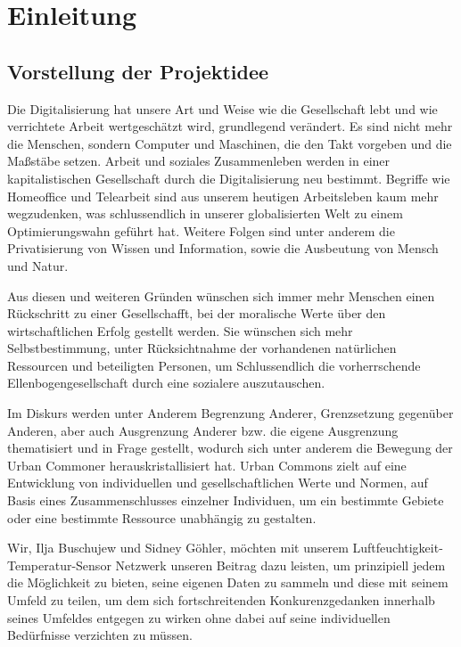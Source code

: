 
\chapter{Einleitung} \label{Einleitung}

\section{Vorstellung der Projektidee} \label{Vorstellung der Projektidee}

Die Digitalisierung hat unsere Art und Weise wie die Gesellschaft lebt und wie verrichtete Arbeit wertgeschätzt wird, grundlegend verändert. Es sind nicht mehr die Menschen, sondern Computer und Maschinen, die den Takt vorgeben und die Maßstäbe setzen. Arbeit und soziales Zusammenleben werden in einer kapitalistischen Gesellschaft durch die Digitalisierung neu bestimmt. Begriffe wie Homeoffice und Telearbeit sind aus unserem heutigen Arbeitsleben kaum mehr wegzudenken, was schlussendlich in unserer globalisierten Welt zu einem Optimierungswahn geführt hat. Weitere Folgen sind unter anderem die Privatisierung von Wissen und Information, sowie die Ausbeutung von Mensch und Natur.

Aus diesen und weiteren Gründen wünschen sich immer mehr Menschen einen Rückschritt zu einer Gesellschafft, bei der moralische Werte über den wirtschaftlichen Erfolg gestellt werden.
Sie wünschen sich mehr Selbstbestimmung, unter Rücksichtnahme der vorhandenen natürlichen Ressourcen und beteiligten Personen, um Schlussendlich die vorherrschende Ellenbogengesellschaft durch eine sozialere auszutauschen.

Im Diskurs werden unter Anderem Begrenzung Anderer, Grenzsetzung gegenüber Anderen, aber auch Ausgrenzung Anderer bzw. die eigene Ausgrenzung thematisiert und in Frage gestellt, wodurch sich unter anderem die Bewegung der Urban Commoner herauskristallisiert hat.
Urban Commons zielt auf eine Entwicklung von individuellen und gesellschaftlichen Werte und Normen, auf Basis eines Zusammenschlusses einzelner Individuen, um ein bestimmte Gebiete oder eine bestimmte Ressource unabhängig zu gestalten.

Wir, Ilja Buschujew und Sidney Göhler, möchten mit unserem Luftfeuchtigkeit-Temperatur-Sensor Netzwerk unseren Beitrag dazu leisten, um prinzipiell jedem die Möglichkeit zu bieten, seine eigenen Daten zu sammeln und diese mit seinem Umfeld zu teilen, um dem sich fortschreitenden Konkurenzgedanken innerhalb seines Umfeldes entgegen zu wirken ohne dabei auf seine individuellen Bedürfnisse verzichten zu müssen.

